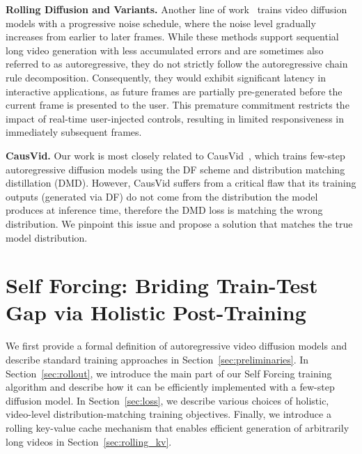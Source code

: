 \documentclass{article}
\begin{document}
\noindent\textbf{Rolling Diffusion and Variants.}
Another line of work~\cite{ruhe2024rolling,kim2025fifo,xie2024progressive,zhang2025packing,magi1,sun2025ar} trains video diffusion models with a progressive noise schedule, where the noise level gradually increases from earlier to later frames. While these methods support sequential long video generation with less accumulated errors and are sometimes also referred to as autoregressive, they do not strictly follow the autoregressive chain rule decomposition. Consequently, they would exhibit significant latency in interactive applications, as future frames are partially pre-generated before the current frame is presented to the user. This premature commitment restricts the impact of real-time user-injected controls, resulting in limited responsiveness in immediately subsequent frames.

\noindent\textbf{CausVid.}
Our work is most closely related to CausVid~\cite{yin2025causvid}, which trains few-step autoregressive diffusion models using the DF scheme and distribution matching distillation (DMD).  However, CausVid suffers from a critical flaw that its training outputs (generated via DF) do not come from the distribution the model produces at inference time, therefore the DMD loss is matching the wrong distribution. We pinpoint this issue and propose a solution that matches the true model distribution.

\section{Self Forcing: Briding Train-Test Gap via Holistic Post-Training}
We first provide a formal definition of autoregressive video diffusion models and describe standard training approaches in Section~\ref{sec:preliminaries}. In Section~\ref{sec:rollout}, we introduce the main part of our Self Forcing training algorithm and describe how it can be efficiently implemented with a few-step diffusion model.
In Section~\ref{sec:loss}, we describe various choices of holistic, video-level distribution-matching training objectives. Finally, we introduce a rolling key-value cache mechanism that enables efficient generation of arbitrarily long videos in Section~\ref{sec:rolling_kv}.
\end{document}
